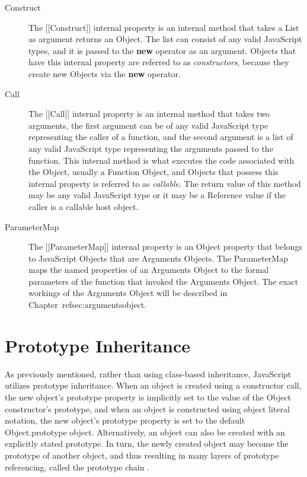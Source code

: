 \documentclass[a4paper,11pt,twoside]{report}
\begin{document}
\begin{description}
\item[Construct]
The [[Construct]] internal property is an internal method that takes a List as argument returns an Object. The list can consist of any valid JavaScript types, and it is passed to the \textbf{new} operator as an argument. Objects that have this internal property are referred to as \textit{constructors}, because they create new Objects via the \textbf{new} operator.

\item[Call]
The [[Call]] internal property is an internal method that takes two arguments, the first argument can be of any valid JavaScript type representing the caller of a function, and the second argument is a list of any valid JavaScript type representing the arguments passed to the function. This internal method is what executes the code associated with the Object, usually a Function Object, and Objects that possess this internal property is referred to as \textit{callable}. The return value of this method may be any valid JavaScript type or it may be a Reference value if the caller is a callable host object.

\item[ParameterMap]
The [[ParameterMap]] internal property is an Object property that belongs to JavaScript Objects that are Arguments Objects. The ParameterMap maps the named properties of an Arguments Object to the formal parameters of the function that invoked the Arguments Object. The exact workings of the Arguments Object will be described in Chapter~ref{sec:argumentsobject}.
\end{description}

\section{Prototype Inheritance}\label{sec:protoinh}
As previously mentioned, rather than using class-based inheritance, JavaScript utilizes prototype inheritance. When an object is created using a constructor call, the new object's prototype property is implicitly set to the value of the Object constructor's prototype, and when an object is constructed using object literal notation, the new object's prototype property is set to the default Object.prototype object. Alternatively, an object can also be created with an explicitly stated prototype. In turn, the newly created object may become the prototype of another object, and thus resulting in many layers of prototype referencing, called the prototype chain \cite{EcmaScript}. 
\end{document}
